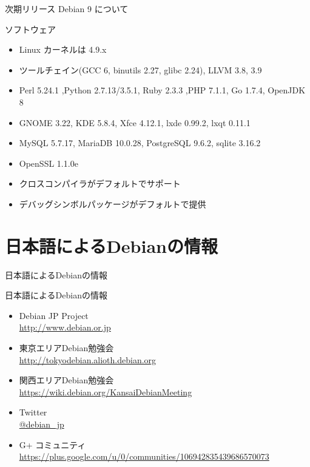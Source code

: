 \begin{frame}{次期リリース Debian 9 について}%

ソフトウェア
\begin{itemize}
\item Linux カーネルは 4.9.x
\item ツールチェイン(GCC 6, binutils 2.27, glibc 2.24), LLVM 3.8, 3.9
\item Perl 5.24.1 ,Python 2.7.13/3.5.1, Ruby 2.3.3 ,PHP 7.1.1, Go 1.7.4, OpenJDK 8
\item GNOME 3.22, KDE 5.8.4, Xfce 4.12.1, lxde 0.99.2, lxqt 0.11.1
\item MySQL 5.7.17, MariaDB 10.0.28, PostgreSQL 9.6.2, sqlite 3.16.2
\item OpenSSL 1.1.0e
\item クロスコンパイラがデフォルトでサポート
\item デバッグシンボルパッケージがデフォルトで提供
\end{itemize}

\end{frame}

\section{日本語によるDebianの情報}
\begin{frame}\begin{center}\Huge{日本語によるDebianの情報}\end{center}\end{frame}

\begin{frame}{日本語によるDebianの情報}
\begin{itemize}
  \item Debian JP Project \\
      \url{http://www.debian.or.jp}
  \item 東京エリアDebian勉強会\\
      \url{http://tokyodebian.alioth.debian.org}
  \item 関西エリアDebian勉強会 \\
      \url{https://wiki.debian.org/KansaiDebianMeeting}
  \item Twitter \\
      \url{@debian_jp}
  \item G+ コミュニティ \\
      \url{https://plus.google.com/u/0/communities/106942835439686570073}
 
\end{itemize}
\end{frame}

